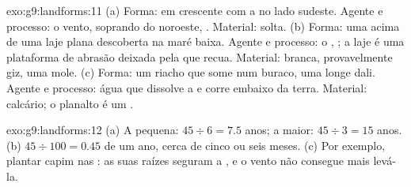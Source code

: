 \begin{solution}{exo:g9:landforms:11}
(a) Forma:  em crescente com a  no lado sudeste.
Agente e processo: o vento, soprando do noroeste, . Material:
 solta. (b) Forma: uma  acima de uma laje plana descoberta na
maré baixa. Agente e processo: o , ; a laje é uma plataforma de
abrasão deixada pela  que recua. Material:  branca,
provavelmente giz, uma  mole. (c) Forma: um riacho que some num
buraco, uma  longe dali. Agente e processo: água que dissolve a
 e corre embaixo da terra. Material: calcário; o planalto é um
.
\end{solution}

\begin{solution}{exo:g9:landforms:12}
(a) A  pequena: $45 \div 6 = 7.5$ anos; a maior: $45 \div 3 =
15$ anos. (b) $45 \div 100 = 0.45$ de um ano, cerca de cinco ou seis
meses. (c) Por exemplo, plantar capim nas : as suas raízes seguram a
, e o vento não consegue mais levá-la.
\end{solution}

